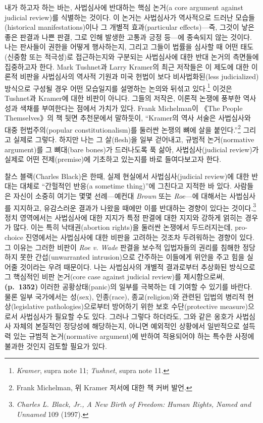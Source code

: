 \documentclass[a4paper,12pt,oneside]{article}  %
\begin{document}
내가 하고자 하는 바는, 사법심사에 반대하는 핵심 논거(a core argument
against judicial review)를 식별하는 것이다. 이 논거는 사법심사가
역사적으로 드러난 모습들(historical manifestations)이나 그 개별적
효과(particular effects)---즉, 그것이 낳은 좋은 판결과 나쁜 판결, 그로
인해 발생한 고통과 긍정 등---에 종속되지 않는 것이다. 나는 판사들이
권한을 어떻게 행사하는지, 그리고 그들이 법률을 심사할 때 어떤
태도(신중함 또는 적극성)로 접근하는지와 구분되는 사법심사에 대한 반대
논거의 측면들에 집중하고자 한다. Mark Tushnet과 Larry Kramer의 최근
저작들은 이 제도에 대한 이론적 비판을 사법심사의 역사적 기원과 미국
헌법이 보다 비사법화된(less judicialized) 방식으로 구성될 경우 어떤
모습일지를 설명하는 논의와 뒤섞고 있다.\footnote{\emph{Kramer}, supra
  note 11; \emph{Tushnet}, supra note 11.} 이것은 Tushnet과 Kramer에
대한 비판이 아니다. 그들의 저작은, 이론적 논쟁에 풍부한 역사성과 색채를
부여한다는 점에서 가치가 있다. Frank Michelman이 《The People
Themselves》의 책 뒷면 추천문에서 말하듯이, ``Kramer의 역사 서술은
사법심사와 대중 헌법주의(popular constitutionalism)를 둘러싼 논쟁의 뼈에
살을 붙인다.''\footnote{Frank Michelman, 위 Kramer 저서에 대한 책 커버
  발언.} 그리고 실제로 그렇다. 하지만 나는 그 살(flesh)을 일부 걷어내고,
규범적 논거(normative argument)를 그 뼈대(bare bones)가 드러나도록 푹
삶아, 사법심사(judicial review)가 실제로 어떤 전제(premise)에 기초하고
있는지를 바로 들여다보고자 한다.

찰스 블랙(Charles Black)은 한때, 실제 현실에서 사법심사(judicial
review)에 대한 반대는 대체로 ``간헐적인 반응(a sometime thing)''에
그친다고 지적한 바 있다. 사람들은 자신이 소중히 여기는 몇몇
선례---예컨대 \emph{Brown} 또는 \emph{Roe}---에 대해서는 사법심사를
지지하고, 유감스러운 결과가 나왔을 때에만 이를 반대하는 경향이 있다는
것이다.\footnote{\emph{Charles L. Black, Jr., A New Birth of Freedom:
  Human Rights, Named and Unnamed} 109 (1997).} 정치 영역에서는
사법심사에 대한 지지가 특정 판결에 대한 지지와 강하게 얽히는 경우가
많다. 이는 특히 낙태권(abortion rights)을 둘러싼 논쟁에서 두드러지는데,
pro-choice 진영에서는 사법심사에 대한 비판을 고려하는 것조차 두려워하는
경향이 있다. 그 이유는 그러한 비판이 \emph{Roe v. Wade} 판결을 보수적
입법자들의 권리를 침해한 정당하지 못한 간섭(unwarranted intrusion)으로
간주하는 이들에게 위안을 주고 힘을 실어줄 것이라는 우려 때문이다. 나는
사법심사의 개별적 결과로부터 추상화된 방식으로 그 핵심적인 비판
논거(core case against judicial review)를 제시함으로써,
\textbf{(p.~1352)} 이러한 공황상태(panic)의 일부를 극복하는 데 기여할 수
있기를 바란다. 물론 일부 국가에서는 성(sex), 인종(race),
종교(religion)와 관련된 입법의 병리적 현상(legislative
pathologies)으로부터 방어하기 위한 보호 수단(protective measure)으로서
사법심사가 필요할 수도 있다. 그러나 그렇다 하더라도, 그와 같은 옹호가
사법심사 자체의 본질적인 정당성에 해당하는지, 아니면 예외적인 상황에서
일반적으로 설득력 있는 규범적 논거(normative argument)에 반하여
적용되어야 하는 특수한 사정에 불과한 것인지 검토할 필요가 있다.
\end{document}
